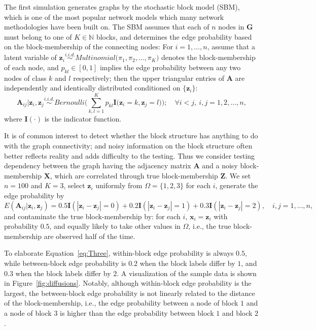 \documentclass[12pt]{article}
\theoremstyle{definition}
\begin{document}
	The first simulation generates graphs by the stochastic block model (SBM), which is one of the most popular network models which many network methodologies have been built on. The SBM assumes that each of $n$ nodes in $\mathbf{G}$ must belong to one of $K \in \mathbb{N}$ blocks, and determines the edge probability based on the block-membership of the connecting nodes: For $i=1,\ldots,n$, assume that a latent variable of $\mathbf{z}_{i} \overset{i.i.d.}{\sim} Multinomial\big( \pi_{1}, \pi_{2}, ... , \pi_{K} \big)$ denotes the block-membership of each node, and $p_{kl} \in [0,1]$ implies the edge probability between any two nodes of class $k$ and $l$ respectively; then the upper triangular entries of $\mathbf{A}$ are independently and identically distributed conditioned on $\{\mathbf{z}_{i}\}$:
	\begin{equation} 
	\mathbf{A}_{ij} \big| \mathbf{z}_{i}, \mathbf{z}_{j} \overset{i.i.d.}{\sim} Bernoulli\big( \sum\limits_{k,l=1}^{K} p_{kl} \mathbf{I} \big( \mathbf{z}_{i} = k, \mathbf{z}_{j} = l  \big)    \big); \quad \forall  i < j,~i,j = 1,2, \ldots, n,
	\end{equation}
	where $\mathbf{I}(\cdot)$ is the indicator function. %
	
	It is of common interest to detect whether the block structure has anything to do with the graph connectivity; and noisy information on the block structure often better reflects reality and adds difficulty to the testing. Thus we consider testing dependency between the graph having the adjacency matrix $\mathbf{A}$ and a noisy block-membership $\mathbf{X}$, which are correlated through true block-membership $\mathbf{Z}$. We set $n=100$ and $K=3$, select $\mathbf{z}_i$ uniformly from $\Omega=\{1,2,3\}$ for each $i$, generate the edge probability by
	\begin{equation}
	\label{eq:Three}
	E(\mathbf{A}_{ij} | \mathbf{z}_{i}, \mathbf{z}_{j}) = 0.5 \mathbf{I}(|\mathbf{z}_{i} - \mathbf{z}_{j}| = 0) + 0.2 \mathbf{I}(|\mathbf{z}_{i} - \mathbf{z}_{j}| = 1) + 0.3 \mathbf{I}(|\mathbf{z}_{i} - \mathbf{z}_{j}| = 2), \quad i,j = 1, \ldots, n,
	\end{equation} 
	and contaminate the true block-membership by: for each $i$, $\mathbf{x}_{i}=\mathbf{z}_{i}$ with probability $0.5$, and equally likely to take other values in $\Omega$, i.e., the true block-membership are observed half of the time.
	
	To elaborate Equation~\ref{eq:Three}, within-block edge probability is always $0.5$, while between-block edge probability is $0.2$ when the block labels differ by $1$, and $0.3$ when the block labels differ by $2$. A visualization of the sample data is shown in Figure~\ref{fig:diffusions}. 
	Notably, although within-block edge probability is the largest, the between-block edge probability is not linearly related to the distance of the block-membership, i.e., the edge probability between a node of block $1$ and a node of block $3$ is higher than the edge probability between block $1$ and block $2$. 
	
\end{document}

